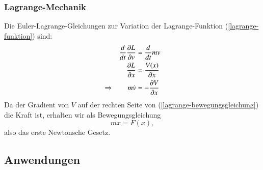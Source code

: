 \subsubsection{Lagrange-Mechanik}
Die Euler-Lagrange-Gleichungen zur Variation der Lagrange-Funktion
(\ref{lagrange-funktion}) sind:
\begin{align}
\frac{d}{dt}\frac{\partial L}{\partial v}&=\frac{d}{dt}mv
\notag
\\
\frac{\partial L}{\partial x}&=\frac{V(x)}{\partial x}
\notag
\\
\Rightarrow\qquad
m\dot v&=-\frac{\partial V}{\partial x}
\label{lagrange-bewegungsgleichung}
\end{align}
Da der Gradient von $V$ auf der rechten Seite von
(\ref{lagrange-bewegungsgleichung}) die Kraft ist, erhalten wir als
Bewegungsgleichung
\begin{equation}
m\ddot x=F(x),
\end{equation}
also das erste Newtonsche Gesetz.

\subsection{Anwendungen}
